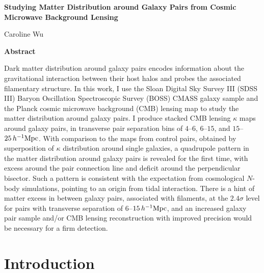 \documentclass[11pt,letterpaper]{article}
\newcommand{\hinvMpc}{h^{-1}{\rm Mpc}}
\begin{document}
\begin{titlepage}
  \centering
  \vspace*{\fill}
  {\LARGE\bfseries Studying Matter Distribution around Galaxy Pairs from Cosmic Microwave Background Lensing\par}
  \vspace{2.5em}
  {\Large Caroline Wu\par}
  \vspace*{\fill}
\end{titlepage}

\thispagestyle{empty}
\begin{center}
  {\large\bfseries Abstract}
\end{center}
Dark matter distribution around galaxy pairs encodes information about the gravitational interaction between their host halos and probes the associated filamentary structure. In this work, I use the Sloan Digital Sky Survey III (SDSS III) Baryon Oscillation Spectroscopic Survey (BOSS) CMASS galaxy sample and the Planck cosmic microwave background (CMB) lensing map to study the matter distribution around galaxy pairs. I produce stacked CMB lensing $\kappa$ maps around galaxy pairs, in transverse pair separation bins of $4$--$6$, $6$--$15$, and $15$--$25\,\hinvMpc$. With comparison to the maps from control pairs, obtained by superposition of $\kappa$ distribution around single galaxies, a quadrupole pattern in the matter distribution around galaxy pairs is revealed for the first time, with excess around the pair connection line and deficit around the perpendicular bisector. Such a pattern is consistent with the expectation from cosmological $N$-body simulations, pointing to an origin from tidal interaction. There is a hint of matter excess in between galaxy pairs, associated with filaments, at the $2.4\sigma$ level for pairs with transverse separation of $6$--$15\,\hinvMpc$, and an increased galaxy pair sample and/or CMB lensing reconstruction with improved precision would be necessary for a firm detection.

\clearpage
{}
\setcounter{page}{1}

\section{Introduction}
\end{document}
